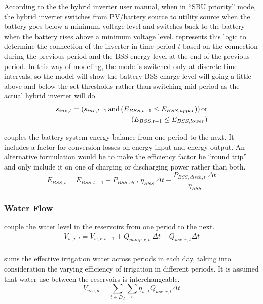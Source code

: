 According to the the hybrid inverter user manual, when in ``SBU priority'' mode, the hybrid inverter switches from PV/battery source to utility source when the battery goes below a minimum voltage level and switches back to the battery when the battery rises above a minimum voltage level.  represents this logic to determine the connection of the inverter in time period $t$ based on the connection during the previous period and the BSS energy level at the end of the previous period. In this way of modeling, the mode is switched only at discrete time intervals, so the model will show the battery BSS charge level will going a little above and below the set thresholds rather than switching mid-period as the actual hybrid inverter will do.
%
\begin{equation}
\label{eqn:inverter-mode}
\begin{split}
s_{inv,t} = \left(s_{inv,t-1} \operatorname{and} \left(E_{BSS,t-1} \le E_{BSS,upper} \right) \right)
\operatorname{or}
\\
\left( E_{BSS,t-1} \le E_{BSS,lower} \right)
\end{split}
\end{equation}

 couples the battery system energy balance from one period to the next. It includes a factor for conversion losses on energy input and energy output. An alternative formulation would be to make the efficiency factor be ``round trip'' and only include it on one of charging or discharging power rather than both.
%
\begin{equation}
\label{eqn:BSS-balance}
E_{BSS,t} = E_{BSS,t-1} + P_{BSS,ch,t} \ \eta_{BSS} \ \Delta t - \frac{P_{BSS,disch,t} \ \Delta t}{\eta_{BSS}}
\end{equation}

\subsubsection{Water Flow}

 couple the water level in the reservoirs from one period to the next.
%
\begin{gather}
\label{eqn:water-balance}
V_{w,r,t} = V_{w,r,t-1} + Q_{pump,r,t} \ \Delta t - Q_{use,r,t} \Delta t \\
\end{gather}

 sums the effective irrigation water across periods in each day, taking into consideration the varying efficiency of irrigation in different periods.
It is assumed that water use between the reservoirs is interchangeable.
%
\begin{equation}
\label{eqn:total-water}
V_{use,d} = \sum_{t \in D_d}  \sum_{r} \eta_{w,t} Q_{use,r,t} \Delta t
\end{equation}

